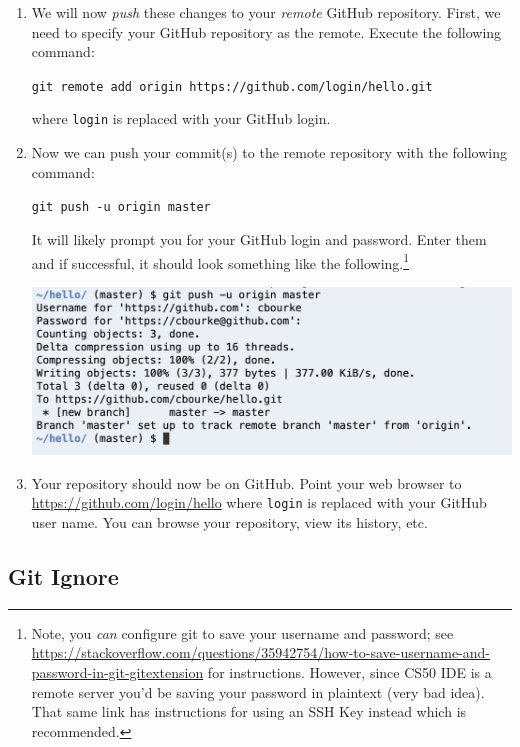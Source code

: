 \documentclass[12pt]{scrartcl}
\begin{document}
\begin{enumerate}
  \item We will now \emph{push} these changes to your \emph{remote}
  GitHub repository.  First, we need to specify your GitHub 
  repository as the remote.  Execute the following command:
  
  \texttt{git remote add origin https://github.com/login/hello.git}
  
  where \texttt{login} is replaced with your GitHub login.
  
  \item Now we can push your commit(s) to the remote repository
  with the following command:
  
  \texttt{git push -u origin master}
  
  It will likely prompt you for your GitHub login and password.
  Enter them and if successful, it should look something like
  the following.\footnote{Note, you \emph{can} configure git 
  to save your username and password; see \url{https://stackoverflow.com/questions/35942754/how-to-save-username-and-password-in-git-gitextension} for
  instructions.  However, since CS50 IDE is a remote server you'd
  be saving your password in plaintext (very bad idea).  That same
  link has instructions for using an SSH Key instead which is
  recommended.}
  
  \begin{center}
  \includegraphics[scale=0.50]{./hack1.0-files/cl-gitPush}
  \end{center}

  \item Your repository should now be on GitHub.
  Point your web browser to \url{https://github.com/login/hello}
  where \texttt{login} is replaced with your GitHub user
  name.  You can browse your repository, view its history, etc.
  
\end{enumerate}

\subsection{Git Ignore}
\end{document}
